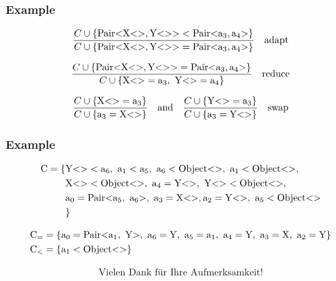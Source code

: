 \documentclass[aspectratio=169]{beamer}
\begin{document}
\begin{frame}[fragile]
    \frametitle{Example}
    \begin{align*}
        \frac{C \cup \{ \text{Pair} \text{<} \text{X} \text{<}  \text{>}, \text{Y} \text{<}  \text{>} \text{>} < \text{Pair} \text{<} \text{a}_{3}, \text{a}_{4} \text{>} \} }{C \cup \{ \text{Pair} \text{<} \text{X} \text{<}  \text{>}, \text{Y} \text{<}  \text{>} \text{>} = \text{Pair} \text{<} \text{a}_{3}, \text{a}_{4} \text{>} \} } \quad \text{adapt}
    \end{align*}

    \begin{align*}
        \frac{\cand \{ \nvtt{Pair}{\nvtt{X}{}, \nvtt{Y}{}} = \nvtt{Pair}{\fa{3}, \fa{4}} \} }{\cand \{ \nvtt{X}{} = \fa{3}, \ \nvtt{Y}{} = \fa{4} \} } \quad \text{reduce}
    \end{align*}

    \begin{align*}
        \frac{C \cup \{ \text{X} \text{<}  \text{>} = \text{a}_{3} \} }{C \cup \{ \text{a}_{3} = \text{X} \text{<}  \text{>} \} } \quad \text{and} \quad \frac{C \cup \{ \text{Y} \text{<}  \text{>} = \text{a}_{3} \} }{C \cup \{ \text{a}_{3} = \text{Y} \text{<}  \text{>} \} } \quad \text{swap}
    \end{align*}
\end{frame}

\begin{frame}[fragile]
    \frametitle{Example}
    \begin{align*}
        \text{C} = \{& \nvtt{Y}{} < \fa{6}, \ \fa{1} < \fa{5}, \ \fa{6} < \nvtt{Object}{}, \ \fa{1} < \nvtt{Object}{}, \\
        &\nvtt{X}{} < \nvtt{Object}{}, \ \fa{4} = \nvtt{Y}{}, \ \nvtt{Y}{} < \nvtt{Object}{}, \\
        &\fa{0} = \nvtt{Pair}{\fa{5}, \ \fa{6}}, \ \fa{3} = \nvtt{X}{}, \fa{2} = \nvtt{Y}{}, \ \fa{5} < \nvtt{Object}{} \\
        &\}
    \end{align*}

    \begin{align*}
        \text{C}_= &= \{ \fa{0} = \nvtt{Pair}{\fa{1}, \ \text{Y}}, \ \fa{6} = \text{Y}, \ \fa{5} = \fa{1}, \ \fa{4} = \text{Y}, \ \fa{3} = \text{X}, \ \fa{2} = \text{Y} \}\\
        \text{C}_< &= \{ \fa{1} < \nvtt{Object}{} \}
    \end{align*}
\end{frame}

\begin{frame}[fragile]
    \begin{align*}
        \text{Vielen Dank für Ihre Aufmerksamkeit!}
    \end{align*}
\end{frame}
\end{document}
